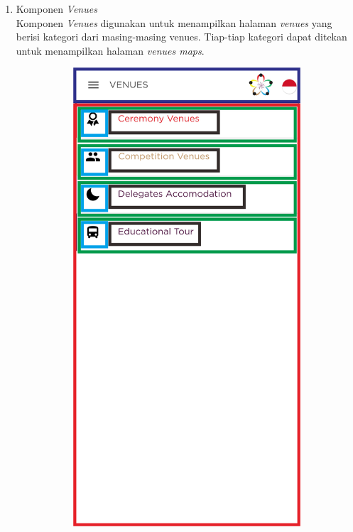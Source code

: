 \begin{enumerate}
	\item Komponen \textit{Venues} \\
	Komponen \textit{Venues} digunakan untuk menampilkan halaman \textit{venues} yang berisi kategori dari masing-masing venues. Tiap-tiap kategori dapat ditekan untuk menampilkan halaman \textit{venues maps}. 
	\begin{figure}[H]
    	\centering
     	\begin{subfigure}[b]{0.435\textwidth}
        	\centering
         	\includegraphics[scale=0.465]{Gambar/VenuePageWireframe.png}

\end{subfigure}
\end{figure}
\end{enumerate}
